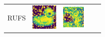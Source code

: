 \begin{table}[!ht]
\begin{tabular}{>{\centering\arraybackslash}p{0.95in}>{\centering\arraybackslash}p{1.0in}>{\centering\arraybackslash}p{1.0in}>{\centering\arraybackslash}p{1.0in}>{\centering\arraybackslash}p{1.0in}}
        RUFS & \parbox[c]{1.0in}{
        \includegraphics[width=1\linewidth]{figures/CPUFS/visualization/feaRUFS_COIL20.pdf}} & \parbox[c]{1.0in}{
        \includegraphics[width=1\linewidth]{figures/CPUFS/visualization/feaRUFS_breastmnist.pdf}} & \parbox[c]{1.0in}{
}
\end{tabular}
\end{table}
